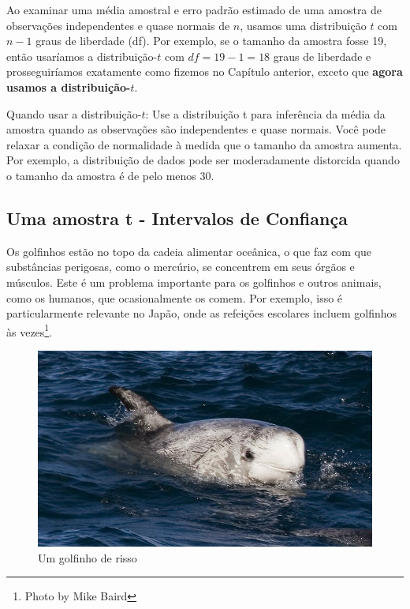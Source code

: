 \documentclass[
]{book}
\theoremstyle{definition}
\theoremstyle{definition}
\theoremstyle{definition}
\theoremstyle{definition}
\theoremstyle{remark}
\begin{document}
Ao examinar uma média amostral e erro padrão estimado de uma amostra de observações independentes e quase normais de \(n\), usamos uma distribuição \(t\) com \(n-1\) graus de liberdade (df). Por exemplo, se o tamanho da amostra fosse 19, então usaríamos a distribuição-\(t\) com \(df =19-1=18\) graus de liberdade e prosseguiríamos exatamente como fizemos no Capítulo anterior, exceto que \textbf{agora usamos a distribuição-\(t\)}.

Quando usar a distribuição-\(t\): Use a distribuição t para inferência da média da amostra quando as observações são independentes e quase normais. Você pode relaxar a condição de normalidade à medida que o tamanho da amostra aumenta. Por exemplo, a distribuição de dados pode ser moderadamente distorcida quando o tamanho da amostra é de pelo menos 30.

\hypertarget{oneSampleTConfidenceIntervals}{%
\subsection{Uma amostra t - Intervalos de Confiança}\label{oneSampleTConfidenceIntervals}}

Os golfinhos estão no topo da cadeia alimentar oceânica, o que faz com que substâncias perigosas, como o mercúrio, se concentrem em seus órgãos e músculos. Este é um problema importante para os golfinhos e outros animais, como os humanos, que ocasionalmente os comem. Por exemplo, isso é particularmente relevante no Japão, onde as refeições escolares incluem golfinhos às vezes\footnote{Photo by Mike Baird}.

\begin{figure}
\includegraphics[width=11.11in]{images/c5/rissosDolphin} \caption{Um golfinho de risso}\label{fig:unnamed-chunk-191}
\end{figure}
\end{document}
